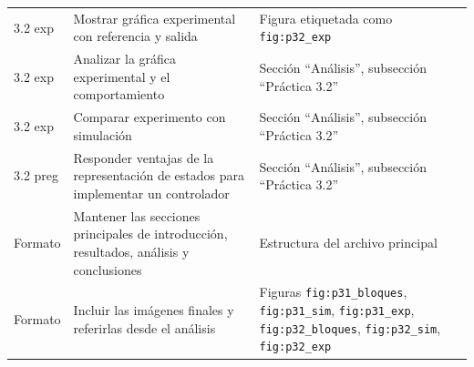 \documentclass[11pt]{article}
\begin{document}
\begin{longtable}{p{2.2cm} p{8.7cm} p{4.0cm}}
3.2 exp & Mostrar gr\'afica experimental con referencia y salida & Figura etiquetada como \texttt{fig:p32\_exp} \\
3.2 exp & Analizar la gr\'afica experimental y el comportamiento & Secci\'on ``An\'alisis'', subsecci\'on ``Pr\'actica 3.2'' \\
3.2 exp & Comparar experimento con simulaci\'on & Secci\'on ``An\'alisis'', subsecci\'on ``Pr\'actica 3.2'' \\
3.2 preg & Responder ventajas de la representaci\'on de estados para implementar un controlador & Secci\'on ``An\'alisis'', subsecci\'on ``Pr\'actica 3.2'' \\

Formato & Mantener las secciones principales de introducci\'on, resultados, an\'alisis y conclusiones & Estructura del archivo principal \\
Formato & Incluir las im\'agenes finales y referirlas desde el an\'alisis & Figuras \texttt{fig:p31\_bloques}, \texttt{fig:p31\_sim}, \texttt{fig:p31\_exp}, \texttt{fig:p32\_bloques}, \texttt{fig:p32\_sim}, \texttt{fig:p32\_exp} \\
\end{longtable}
\end{document}
